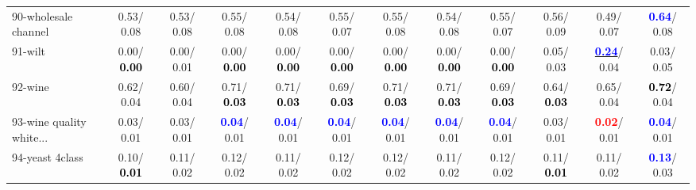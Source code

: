 \begin{table}[h]
\begin{center}
{\begin{tabular}{lc|c|c|c|c|c|c|c|c|c|c}
90-wholesale channel &   0.53/  0.08 &   0.53/  0.08 &   0.55/  0.08 &   0.54/  0.08 &   0.55/  0.07 &   0.55/  0.08 &   0.54/  0.08 &   0.55/  0.07 &   0.56/  0.09 &   0.49/  0.07 & \textcolor{blue}{\textbf{  0.64}}/  0.08 \\
91-wilt &   0.00/\textcolor{black}{\textbf{  0.00}} &   0.00/  0.01 &   0.00/\textcolor{black}{\textbf{  0.00}} &   0.00/\textcolor{black}{\textbf{  0.00}} &   0.00/\textcolor{black}{\textbf{  0.00}} &   0.00/\textcolor{black}{\textbf{  0.00}} &   0.00/\textcolor{black}{\textbf{  0.00}} &   0.00/\textcolor{black}{\textbf{  0.00}} &   0.05/  0.03 & \underline{\textcolor{blue}{\textbf{  0.24}}}/  0.04 &   0.03/  0.05 \\
92-wine &   0.62/  0.04 &   0.60/  0.04 &   0.71/\textcolor{black}{\textbf{  0.03}} &   0.71/\textcolor{black}{\textbf{  0.03}} &   0.69/\textcolor{black}{\textbf{  0.03}} &   0.71/\textcolor{black}{\textbf{  0.03}} &   0.71/\textcolor{black}{\textbf{  0.03}} &   0.69/\textcolor{black}{\textbf{  0.03}} &   0.64/\textcolor{black}{\textbf{  0.03}} &   0.65/  0.04 & \textcolor{black}{\textbf{  0.72}}/  0.04 \\ \hline
93-wine quality white... &   0.03/  0.01 &   0.03/  0.01 & \textcolor{blue}{\textbf{  0.04}}/  0.01 & \textcolor{blue}{\textbf{  0.04}}/  0.01 & \textcolor{blue}{\textbf{  0.04}}/  0.01 & \textcolor{blue}{\textbf{  0.04}}/  0.01 & \textcolor{blue}{\textbf{  0.04}}/  0.01 & \textcolor{blue}{\textbf{  0.04}}/  0.01 &   0.03/  0.01 & \textcolor{red}{\textbf{  0.02}}/  0.01 & \textcolor{blue}{\textbf{  0.04}}/  0.01 \\
94-yeast 4class &   0.10/\textcolor{black}{\textbf{  0.01}} &   0.11/  0.02 &   0.12/  0.02 &   0.11/  0.02 &   0.12/  0.02 &   0.12/  0.02 &   0.11/  0.02 &   0.12/  0.02 &   0.11/\textcolor{black}{\textbf{  0.01}} &   0.11/  0.02 & \textcolor{blue}{\textbf{  0.13}}/  0.03 \\\end{tabular}
}\label{strats2aCIELM}
\end{center}
\end{table}
